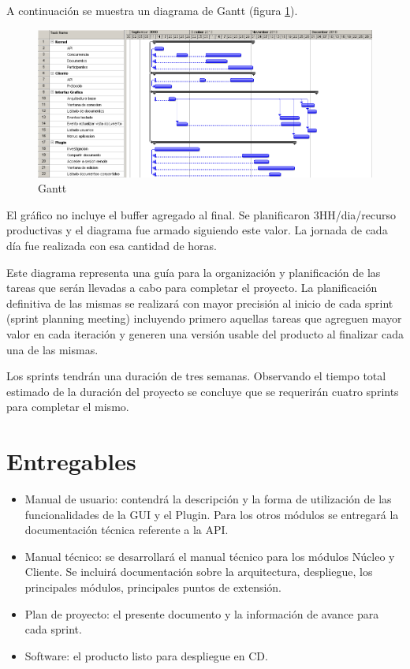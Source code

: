\documentclass[12pt,a4paper]{article}
\begin{document}
	A continuación se muestra un diagrama de Gantt (figura \ref{gantt}).


	\begin{figure}[!ht]
		\begin{center}
			\includegraphics[width=14cm]{gantt.png}
			\caption{\label{gantt} Gantt }
		\end{center}
	\end{figure}

	El gráfico no incluye el buffer agregado al final. Se planificaron 3HH/dia/recurso productivas y el diagrama fue armado siguiendo este valor. La jornada de cada día fue realizada con esa cantidad de horas.

	Este diagrama representa una guía para la organización y planificación de las tareas que serán llevadas a cabo para completar el proyecto. La planificación definitiva de las mismas se realizará con mayor precisión al inicio de cada sprint (sprint planning meeting) incluyendo primero aquellas tareas que agreguen mayor valor en cada iteración y generen una versión usable del producto al finalizar cada una de las mismas.

	Los sprints tendrán una duración de tres semanas. Observando el tiempo total estimado de la duración del proyecto se concluye que se requerirán cuatro sprints para completar el mismo.

	\section{Entregables}

	\begin{itemize}
	\item Manual de usuario: contendrá la descripción y la forma de utilización de las funcionalidades de la GUI y el Plugin. Para los otros módulos se entregará la documentación técnica referente a la API.
	\item Manual técnico: se desarrollará el manual técnico para los módulos Núcleo y Cliente. Se incluirá documentación sobre la arquitectura, despliegue, los principales módulos, principales puntos de extensión.
	\item Plan de proyecto: el presente documento y la información de avance para cada sprint.
	\item Software: el producto listo para despliegue en CD.
	\end{itemize}
\end{document}
